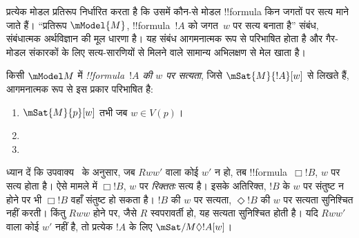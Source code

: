 \documentclass[../../../include/open-logic-section]{subfiles}
\begin{document}


प्रत्येक मोडल प्रतिरूप निर्धारित करता है कि उसमें कौन-से मोडल !!{formula} किन
जगतों पर सत्य माने जाते हैं। ``प्रतिरूप $\mModel{M}$, !!{formula}~$!A$ को
जगत~$w$ पर सत्य बनाता है'' संबंध, संबंधात्मक अर्थविज्ञान की मूल धारणा है।
यह संबंध आगमनात्मक रूप से परिभाषित होता है और गैर-मोडल संकारकों के लिए
सत्य-सारणियों से मिलने वाले सामान्य अभिलक्षण से मेल खाता है।

\begin{defn}
  किसी $\mModel M$ में \emph{!!{formula}~$!A$ की $w$ पर सत्यता}, जिसे
  $\mSat{M}{!A}[w]$ से लिखते हैं, आगमनात्मक रूप से इस प्रकार परिभाषित है:
  \begin{enumerate}
  \item $\mSat{M}{p}[w]$ तभी जब $w \in V(p)$।
  \item{}
  \item{}
  \end{enumerate}
\end{defn}

ध्यान दें कि उपवाक्य~ के अनुसार, जब $Rww'$ वाला
कोई $w'$ न हो, तब !!{formula}~$\Box !B$, $w$ पर सत्य होता है। ऐसे मामले में
$\Box !B$, $w$ पर \emph{रिक्ततः} सत्य है। इसके अतिरिक्त, $!B$ के $w$ पर
संतुष्ट न होने पर भी $\Box !B$ वहाँ संतुष्ट हो सकता है। $!B$ की $w$ पर
सत्यता, $\Diamond !B$ की $w$ पर सत्यता सुनिश्चित नहीं करती। किंतु $Rww$
होने पर, जैसे $R$ स्वपरावर्ती हो, यह सत्यता सुनिश्चित होती है। यदि
$Rww'$ वाला कोई $w'$ नहीं है, तो प्रत्येक $!A$ के लिए
$\mSat/{M}{\Diamond !A}[w]$।
\end{document}
